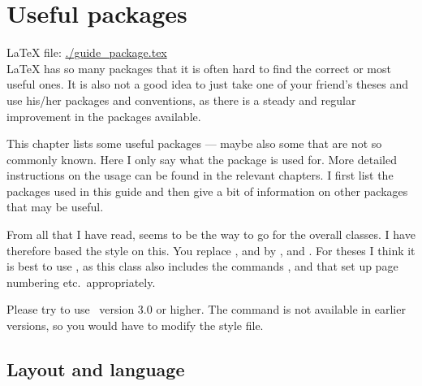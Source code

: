 
\chapter{Useful packages}%
\label{sec:package}

\LaTeX{} file: \url{./guide_package.tex}\\[1ex]
\noindent
\LaTeX{} has so many packages that it is often hard to find the
correct or most useful ones. It is also not a good idea to just take
one of your friend's theses and use his/her packages and conventions,
as there is a steady and regular improvement in the packages
available.

This chapter lists some useful packages --- maybe also some that
are not so commonly known. Here I only say what the package is used
for. More detailed instructions on the usage can be found in the
relevant chapters. I first list the packages used in this guide
and then give a bit of information on other packages that may be useful.

From all that I have read, \KOMAScript{}
seems to be the way to go for the overall classes. I have therefore
based the  style on this. You replace
,  and  by
,  and . For
theses I think it is best to use , as this class also
includes the commands ,  and
 that set up page numbering etc.\ appropriately.

Please try to use \KOMAScript\ version 3.0 or higher. The
 command is not available in earlier versions, so
you would have to modify the style file.


\section{Layout and language}%
\label{sec:package:layout}

